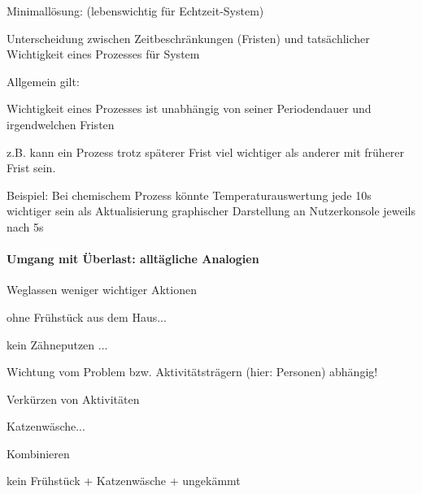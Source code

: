 \documentclass[a4paper]{article}
\begin{document}
\begin{multicols}{3}
    \begin{itemize*}
        \item
        Minimallösung: (lebenswichtig für Echtzeit-System)
        \begin{itemize*}
            \item Unterscheidung zwischen Zeitbeschränkungen (Fristen) und tatsächlicher Wichtigkeit eines Prozesses für System
        \end{itemize*}
        \item
        Allgemein gilt:
        \begin{itemize*}
            \item Wichtigkeit eines Prozesses ist unabhängig von seiner Periodendauer und irgendwelchen Fristen
            \item z.B. kann ein Prozess trotz späterer Frist viel wichtiger als anderer mit früherer Frist sein.
            \item Beispiel: Bei chemischem Prozess könnte Temperaturauswertung jede 10s wichtiger sein als Aktualisierung graphischer Darstellung an Nutzerkonsole jeweils nach 5s
        \end{itemize*}
    \end{itemize*}


    \paragraph{Umgang mit Überlast: alltägliche
        Analogien}

    \begin{enumerate*}
        \item
        Weglassen weniger wichtiger Aktionen
        \begin{itemize*}
            \item ohne Frühstück aus dem Haus...
            \item kein Zähneputzen ...
            \item Wichtung vom Problem bzw. Aktivitätsträgern (hier: Personen) abhängig!
        \end{itemize*}
        \item
        Verkürzen von Aktivitäten
        \begin{itemize*}
            \item Katzenwäsche...
        \end{itemize*}
        \item
        Kombinieren
        \begin{itemize*}
            \item kein Frühstück + Katzenwäsche + ungekämmt
        \end{itemize*}
    \end{enumerate*}



\end{multicols}
\end{document}
